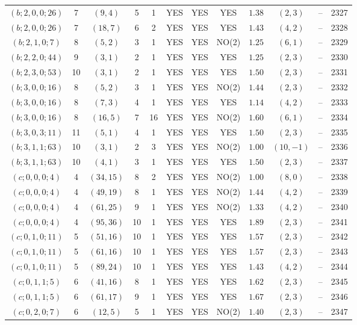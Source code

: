 \begin{longtable}{|c|c|c|c|c|c|c|c|c|c|c|c|}
$(b;2,0,0;26)$ & 7 & $(9,4)$ & 5 & 1 & YES & YES & YES & $1.38$ & $(2,3)$ & -- & 2327\\
$(b;2,0,0;26)$ & 7 & $(18,7)$ & 6 & 2 & YES & YES & YES & $1.43$ & $(4,2)$ & -- & 2328\\
$(b;2,1,0;7)$ & 8 & $(5,2)$ & 3 & 1 & YES & YES & NO(2) & $1.25$ & $(6,1)$ & -- & 2329\\
$(b;2,2,0;44)$ & 9 & $(3,1)$ & 2 & 1 & YES & YES & YES & $1.25$ & $(2,3)$ & -- & 2330\\
$(b;2,3,0;53)$ & 10 & $(3,1)$ & 2 & 1 & YES & YES & YES & $1.50$ & $(2,3)$ & -- & 2331\\
$(b;3,0,0;16)$ & 8 & $(5,2)$ & 3 & 1 & YES & YES & NO(2) & $1.44$ & $(2,3)$ & -- & 2332\\
$(b;3,0,0;16)$ & 8 & $(7,3)$ & 4 & 1 & YES & YES & YES & $1.14$ & $(4,2)$ & -- & 2333\\
$(b;3,0,0;16)$ & 8 & $(16,5)$ & 7 & 16 & YES & YES & NO(2) & $1.60$ & $(6,1)$ & -- & 2334\\
$(b;3,0,3;11)$ & 11 & $(5,1)$ & 4 & 1 & YES & YES & YES & $1.50$ & $(2,3)$ & -- & 2335\\
$(b;3,1,1;63)$ & 10 & $(3,1)$ & 2 & 3 & YES & YES & NO(2) & $1.00$ & $(10,-1)$ & -- & 2336\\
$(b;3,1,1;63)$ & 10 & $(4,1)$ & 3 & 1 & YES & YES & YES & $1.50$ & $(2,3)$ & -- & 2337\\
$(c;0,0,0;4)$ & 4 & $(34,15)$ & 8 & 2 & YES & YES & NO(2) & $1.00$ & $(8,0)$ & -- & 2338\\
$(c;0,0,0;4)$ & 4 & $(49,19)$ & 8 & 1 & YES & YES & NO(2) & $1.44$ & $(4,2)$ & -- & 2339\\
$(c;0,0,0;4)$ & 4 & $(61,25)$ & 9 & 1 & YES & YES & NO(2) & $1.33$ & $(4,2)$ & -- & 2340\\
$(c;0,0,0;4)$ & 4 & $(95,36)$ & 10 & 1 & YES & YES & YES & $1.89$ & $(2,3)$ & -- & 2341\\
$(c;0,1,0;11)$ & 5 & $(51,16)$ & 10 & 1 & YES & YES & YES & $1.57$ & $(2,3)$ & -- & 2342\\
$(c;0,1,0;11)$ & 5 & $(61,16)$ & 10 & 1 & YES & YES & YES & $1.57$ & $(2,3)$ & -- & 2343\\
$(c;0,1,0;11)$ & 5 & $(89,24)$ & 10 & 1 & YES & YES & YES & $1.43$ & $(4,2)$ & -- & 2344\\
$(c;0,1,1;5)$ & 6 & $(41,16)$ & 8 & 1 & YES & YES & YES & $1.62$ & $(2,3)$ & -- & 2345\\
$(c;0,1,1;5)$ & 6 & $(61,17)$ & 9 & 1 & YES & YES & YES & $1.67$ & $(2,3)$ & -- & 2346\\
$(c;0,2,0;7)$ & 6 & $(12,5)$ & 5 & 1 & YES & YES & NO(2) & $1.40$ & $(2,3)$ & -- & 2347\\

\end{longtable}
